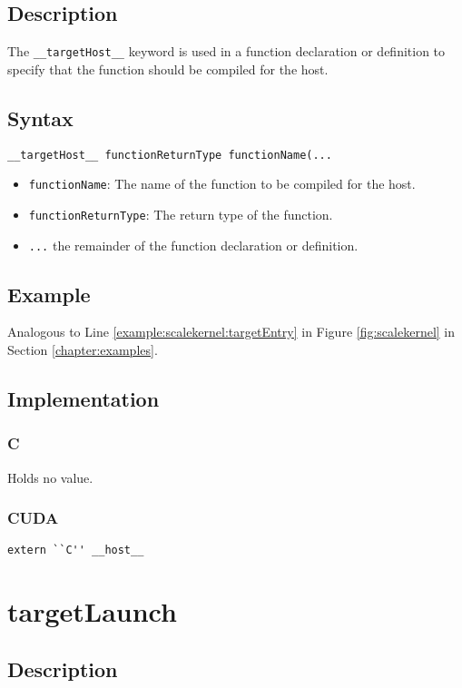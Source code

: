 \subsection{Description}

The \verb+__targetHost__+ keyword is used in a function declaration
or definition to specify that the function should be compiled for the
host.

\subsection{Syntax}
\begin{verbatim}
__targetHost__ functionReturnType functionName(...
\end{verbatim}

\begin{itemize}
\item \verb+functionName+: The name of the function to be compiled for the host.
\item \verb+functionReturnType+: The return type of the function.
\item \verb+...+ the remainder of the function declaration or definition.
\end{itemize}


\subsection{Example}
Analogous to Line \ref{example:scalekernel:targetEntry} in Figure \ref{fig:scalekernel} in Section \ref{chapter:examples}.

\subsection{Implementation}
\subsubsection{C}
Holds no value.
\subsubsection{CUDA}
\verb+extern ``C'' __host__+



\newpage
\section{targetLaunch}

\subsection{Description}

